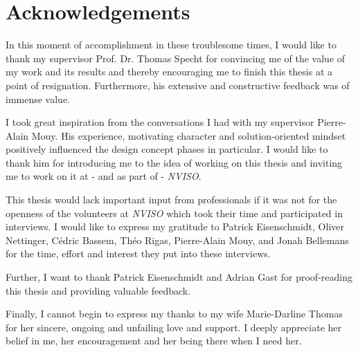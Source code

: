 \chapter*{Acknowledgements}
In this moment of accomplishment in these troublesome times, I would like to thank my supervisor Prof. Dr. Thomas Specht for convincing me of the value of my work and its results and thereby encouraging me to finish this thesis at a point of resignation. Furthermore, his extensive and constructive feedback was of immense value.\par
I took great inspiration from the conversations I had with my supervisor Pierre-Alain Mouy. His experience, motivating character and solution-oriented mindset positively influenced the design concept phases in particular. I would like to thank him for introducing me to the idea of working on this thesis and inviting me to work on it at - and as part of - \emph{NVISO}.\par
This thesis would lack important input from professionals if it was not for the openness of the volunteers at \emph{NVISO} which took their time and participated in interviews. I would like to express my gratitude to Patrick Eisenschmidt, Oliver Nettinger, Cédric Bassem, Théo Rigas, Pierre-Alain Mouy, and Jonah Bellemans for the time, effort and interest they put into these interviews.\par
Further, I want to thank Patrick Eisenschmidt and Adrian Gast for proof-reading this thesis and providing valuable feedback.\par
Finally, I cannot begin to express my thanks to my wife Marie-Darline Thomas for her sincere, ongoing and unfailing love and support. I deeply appreciate her belief in me, her encouragement and her being there when I need her.